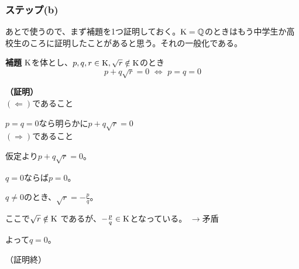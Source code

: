 \subsubsection{ステップ(b)}

あとで使うので、まず補題を1つ証明しておく。$\mathrm{K} = \mathbb{Q}$のときはもう中学生か高校生のころに証明したことがあると思う。それの一般化である。
\begin{itembox}[l]{\bf 補題}
$\mathrm{K}$を体とし、$p,q,r \in \mathrm{K}, \sqrt{r} \notin \mathrm{K}$のとき
$$ p + q\sqrt{r} = 0 \,\,\Longleftrightarrow\,\, p = q = 0$$
\end{itembox}
{\bf （証明）}\\
$(\Leftarrow)$であること \par $p = q = 0$なら明らかに$p + q\sqrt{r} = 0$ \\
$(\Rightarrow)$であること \par
仮定より$p + q\sqrt{r} = 0$。 \par
$q = 0$ならば$p = 0$。\par
$q \neq 0$のとき、$\sqrt{r} = -\frac{p}{q}$。\par
ここで$\sqrt{r} \notin \mathrm{K}$ であるが、$-\frac{p}{q} \in \mathrm{K}$となっている。 $\rightarrow$矛盾\par
よって$q = 0$。
\begin{flushright}
  （証明終）
\end{flushright}


